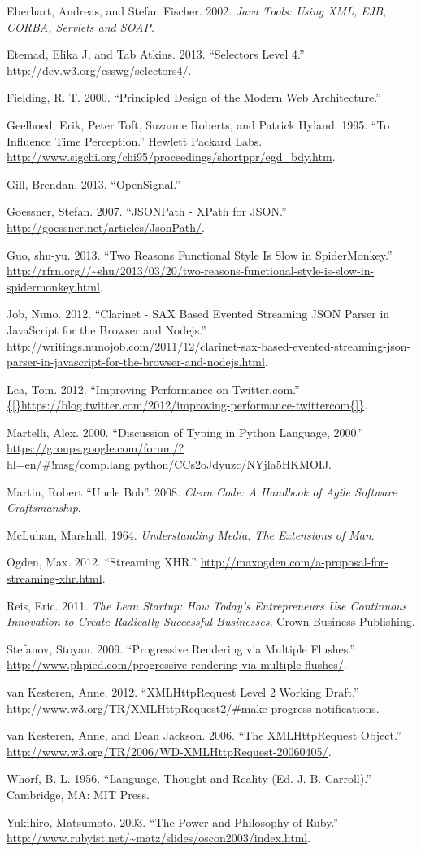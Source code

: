 \documentclass[12pt, ]{article}
\begin{document}
Eberhart, Andreas, and Stefan Fischer. 2002. \emph{Java Tools: Using
XML, EJB, CORBA, Servlets and SOAP}.

Etemad, Elika J, and Tab Atkins. 2013. ``Selectors Level 4.''
\url{http://dev.w3.org/csswg/selectors4/}.

Fielding, R. T. 2000. ``Principled Design of the Modern Web
Architecture.''

Geelhoed, Erik, Peter Toft, Suzanne Roberts, and Patrick Hyland. 1995.
``To Influence Time Perception.'' Hewlett Packard Labs.
\url{http://www.sigchi.org/chi95/proceedings/shortppr/egd_bdy.htm}.

Gill, Brendan. 2013. ``OpenSignal.''

Goessner, Stefan. 2007. ``JSONPath - XPath for JSON.''
\url{http://goessner.net/articles/JsonPath/}.

Guo, shu-yu. 2013. ``Two Reasons Functional Style Is Slow in
SpiderMonkey.''
\url{http://rfrn.org//~shu/2013/03/20/two-reasons-functional-style-is-slow-in-spidermonkey.html}.

Job, Nuno. 2012. ``Clarinet - SAX Based Evented Streaming JSON Parser in
JavaScript for the Browser and Nodejs.''
\url{http://writings.nunojob.com/2011/12/clarinet-sax-based-evented-streaming-json-parser-in-javascript-for-the-browser-and-nodejs.html}.

Lea, Tom. 2012. ``Improving Performance on Twitter.com.''
\url{{[}https://blog.twitter.com/2012/improving-performance-twittercom{]}}.

Martelli, Alex. 2000. ``Discussion of Typing in Python Language, 2000.''
\url{https://groups.google.com/forum/?hl=en/\#!msg/comp.lang.python/CCs2oJdyuzc/NYjla5HKMOIJ}.

Martin, Robert ``Uncle Bob''. 2008. \emph{Clean Code: A Handbook of
Agile Software Craftsmanship}.

McLuhan, Marshall. 1964. \emph{Understanding Media: The Extensions of
Man}.

Ogden, Max. 2012. ``Streaming XHR.''
\url{http://maxogden.com/a-proposal-for-streaming-xhr.html}.

Reis, Eric. 2011. \emph{The Lean Startup: How Today's Entrepreneurs Use
Continuous Innovation to Create Radically Successful Businesses.} Crown
Business Publishing.

Stefanov, Stoyan. 2009. ``Progressive Rendering via Multiple Flushes.''
\url{http://www.phpied.com/progressive-rendering-via-multiple-flushes/}.

van Kesteren, Anne. 2012. ``XMLHttpRequest Level 2 Working Draft.''
\url{http://www.w3.org/TR/XMLHttpRequest2/\#make-progress-notifications}.

van Kesteren, Anne, and Dean Jackson. 2006. ``The XMLHttpRequest
Object.'' \url{http://www.w3.org/TR/2006/WD-XMLHttpRequest-20060405/}.

Whorf, B. L. 1956. ``Language, Thought and Reality (Ed. J. B.
Carroll).'' Cambridge, MA: MIT Press.

Yukihiro, Matsumoto. 2003. ``The Power and Philosophy of Ruby.''
\url{http://www.rubyist.net/~matz/slides/oscon2003/index.html}.
\end{document}
